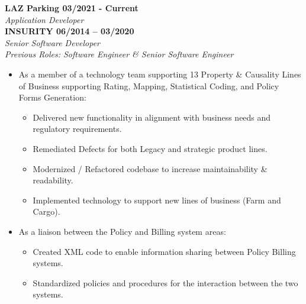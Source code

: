 


\begin{cvparagraph}

   {\normalsize \textbf{LAZ Parking \hfill 03/2021 - Current}} \\
   {\sl Application Developer} \\


   {\normalsize \textbf{ INSURITY \hfill 06/2014 -- 03/2020}} \\
   {\sl Senior Software Developer} \\
   {\sl Previous Roles: Software Engineer \& Senior Software Engineer} \\

   \begin{itemize}
      \item As a member of a technology team supporting 13 Property \& Causality
         Lines of Business supporting Rating, Mapping, Statistical Coding, and Policy 
         Forms Generation:
         \begin{itemize}
            \item Delivered new functionality in alignment with business needs and 
               regulatory requirements.
            \item Remediated Defects for both Legacy and strategic product lines. 
            \item Modernized / Refactored codebase to increase maintainability \& 
               readability.
            \item Implemented technology to support new lines of business (Farm and Cargo).
         \end{itemize}

      \item As a liaison between the Policy and Billing system areas:
         \begin{itemize}
            \item Created XML code to enable information sharing between Policy Billing 
               systems.
            \item Standardized policies and procedures for the interaction between the 
               two systems.
         \end{itemize}


\end{itemize}
\end{cvparagraph}
